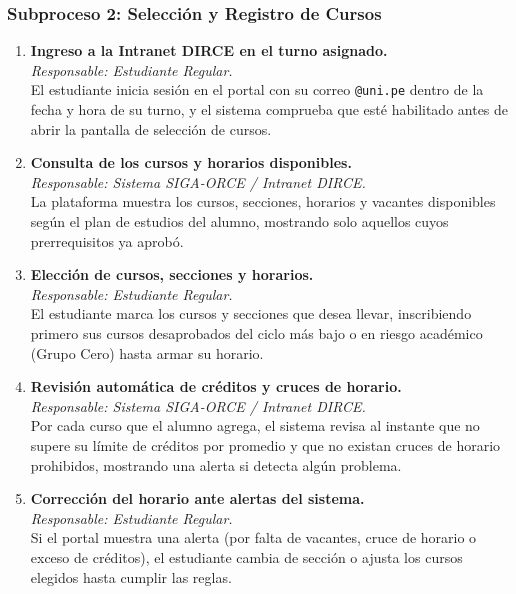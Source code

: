 \subsubsection{Subproceso 2: Selección y Registro de Cursos}

\begin{enumerate}
    \item \textbf{Ingreso a la Intranet DIRCE en el turno asignado.} \\
    \textit{Responsable: Estudiante Regular.} \\
    El estudiante inicia sesión en el portal con su correo \texttt{@uni.pe} dentro de la fecha y hora de su turno, y el sistema comprueba que esté habilitado antes de abrir la pantalla de selección de cursos.

    \item \textbf{Consulta de los cursos y horarios disponibles.} \\
    \textit{Responsable: Sistema SIGA-ORCE / Intranet DIRCE.} \\
    La plataforma muestra los cursos, secciones, horarios y vacantes disponibles según el plan de estudios del alumno, mostrando solo aquellos cuyos prerrequisitos ya aprobó.

    \item \textbf{Elección de cursos, secciones y horarios.} \\
    \textit{Responsable: Estudiante Regular.} \\
    El estudiante marca los cursos y secciones que desea llevar, inscribiendo primero sus cursos desaprobados del ciclo más bajo o en riesgo académico (Grupo Cero) hasta armar su horario.

    \item \textbf{Revisión automática de créditos y cruces de horario.} \\
    \textit{Responsable: Sistema SIGA-ORCE / Intranet DIRCE.} \\
    Por cada curso que el alumno agrega, el sistema revisa al instante que no supere su límite de créditos por promedio y que no existan cruces de horario prohibidos, mostrando una alerta si detecta algún problema.

    \item \textbf{Corrección del horario ante alertas del sistema.} \\
    \textit{Responsable: Estudiante Regular.} \\
    Si el portal muestra una alerta (por falta de vacantes, cruce de horario o exceso de créditos), el estudiante cambia de sección o ajusta los cursos elegidos hasta cumplir las reglas.


\end{enumerate}
